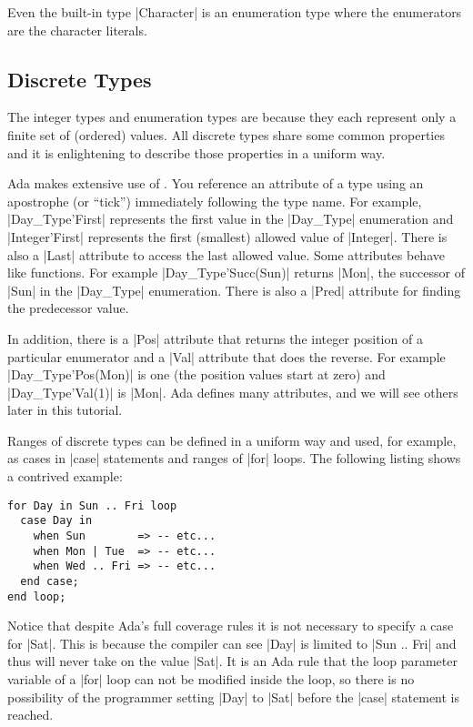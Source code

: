 \noindent Even the built-in type |Character| is an enumeration type where the enumerators are
the character literals.

\subsection{Discrete Types}

The integer types and enumeration types are  because they each represent
only a finite set of (ordered) values. All discrete types share some common properties and it is
enlightening to describe those properties in a uniform way.

Ada makes extensive use of . You reference an attribute of a type using an
apostrophe (or ``tick'') immediately following the type name. For example, |Day_Type'First|
represents the first value in the |Day_Type| enumeration and |Integer'First| represents the
first (smallest) allowed value of |Integer|. There is also a |Last| attribute to access the last
allowed value. Some attributes behave like functions. For example |Day_Type'Succ(Sun)| returns
|Mon|, the successor of |Sun| in the |Day_Type| enumeration. There is also a |Pred| attribute
for finding the predecessor value.

In addition, there is a |Pos| attribute that returns the integer position of a particular
enumerator and a |Val| attribute that does the reverse. For example |Day_Type'Pos(Mon)| is one
(the position values start at zero) and |Day_Type'Val(1)| is |Mon|. Ada defines many attributes,
and we will see others later in this tutorial.

Ranges of discrete types can be defined in a uniform way and used, for example, as cases in
|case| statements and ranges of |for| loops. The following listing shows a contrived example:

\begin{lstlisting}
for Day in Sun .. Fri loop
  case Day in
    when Sun        => -- etc...
    when Mon | Tue  => -- etc...
    when Wed .. Fri => -- etc...
  end case;
end loop;
\end{lstlisting}

\noindent Notice that despite Ada's full coverage rules it is not necessary to specify a case
for |Sat|. This is because the compiler can see |Day| is limited to |Sun .. Fri| and thus will
never take on the value |Sat|. It is an Ada rule that the loop parameter variable of a |for|
loop can not be modified inside the loop, so there is no possibility of the programmer setting
|Day| to |Sat| before the |case| statement is reached.

